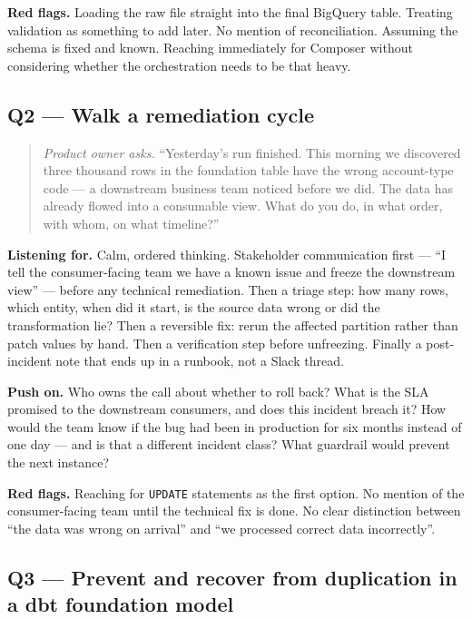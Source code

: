\documentclass[
  11pt,
  british,
  oneside]{book}
\begin{document}
\textbf{Red flags.} Loading the raw file straight into the final
BigQuery table. Treating validation as something to add later. No
mention of reconciliation. Assuming the schema is fixed and known.
Reaching immediately for Composer without considering whether the
orchestration needs to be that heavy.

\hypertarget{q2-walk-a-remediation-cycle}{%
\subsection{Q2 --- Walk a remediation
cycle}\label{q2-walk-a-remediation-cycle}}

\begin{quote}
\emph{Product owner asks.} ``Yesterday's run finished. This morning we
discovered three thousand rows in the foundation table have the wrong
account-type code --- a downstream business team noticed before we did.
The data has already flowed into a consumable view. What do you do, in
what order, with whom, on what timeline?''
\end{quote}

\textbf{Listening for.} Calm, ordered thinking. Stakeholder
communication first --- ``I tell the consumer-facing team we have a
known issue and freeze the downstream view'' --- before any technical
remediation. Then a triage step: how many rows, which entity, when did
it start, is the source data wrong or did the transformation lie? Then a
reversible fix: rerun the affected partition rather than patch values by
hand. Then a verification step before unfreezing. Finally a
post-incident note that ends up in a runbook, not a Slack thread.

\textbf{Push on.} Who owns the call about whether to roll back? What is
the SLA promised to the downstream consumers, and does this incident
breach it? How would the team know if the bug had been in production for
six months instead of one day --- and is that a different incident
class? What guardrail would prevent the next instance?

\textbf{Red flags.} Reaching for \texttt{UPDATE} statements as the first
option. No mention of the consumer-facing team until the technical fix
is done. No clear distinction between ``the data was wrong on arrival''
and ``we processed correct data incorrectly''.

\hypertarget{q3-prevent-and-recover-from-duplication-in-a-dbt-foundation-model}{%
\subsection{Q3 --- Prevent and recover from duplication in a dbt
foundation
model}\label{q3-prevent-and-recover-from-duplication-in-a-dbt-foundation-model}}
\end{document}

